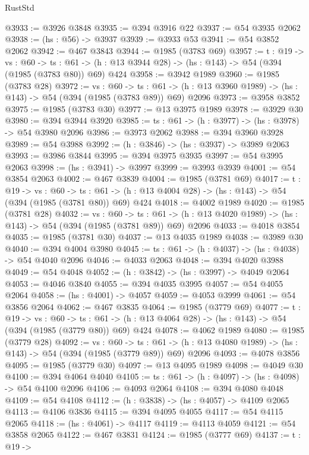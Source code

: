 \begin{lexlean}{RustStd}
\begin{coremodule}
{\begin{coremodule}
{{{{{{{{{{@3933 := @3926 @3848
@3935 := @394 @3916 @22
@3937 := @54 @3935 @2062
@3938 := (hs : @56) -> @3937
@3939 := @3933 @53
@3941 := @54 @3852 @2062
@3942 := @467 @3843
@3944 := @1985 (@3783 @69)
@3957 := {t : @19} ->
  {vs : @60} ->
  {ts : @61} -> (h : @13 @3944 @28) -> (hs : @143) -> @54 (@394 (@1985 (@3783 @80)) @69) @424
@3958 := @3942 @1989
@3960 := @1985 (@3783 @28)
@3972 := {vs : @60} ->
  {ts : @61} -> (h : @13 @3960 @1989) -> (hs : @143) -> @54 (@394 (@1985 (@3783 @89)) @69) @2096
@3973 := @3958 @3852
@3975 := @1985 (@3783 @30)
@3977 := @13 @3975 @1989
@3978 := @3929 @30
@3980 := @394 @3944 @3920
@3985 := {ts : @61} -> (h : @3977) -> (hs : @3978) -> @54 @3980 @2096
@3986 := @3973 @2062
@3988 := @394 @3960 @3928
@3989 := @54 @3988
@3992 := (h : @3846) -> (hs : @3937) -> @3989 @2063
@3993 := @3986 @3844
@3995 := @394 @3975 @3935
@3997 := @54 @3995 @2063
@3998 := (hs : @3941) -> @3997
@3999 := @3993 @3939
@4001 := @54 @3854 @2063
@4002 := @467 @3839
@4004 := @1985 (@3781 @69)
@4017 := {t : @19} ->
  {vs : @60} ->
  {ts : @61} -> (h : @13 @4004 @28) -> (hs : @143) -> @54 (@394 (@1985 (@3781 @80)) @69) @424
@4018 := @4002 @1989
@4020 := @1985 (@3781 @28)
@4032 := {vs : @60} ->
  {ts : @61} -> (h : @13 @4020 @1989) -> (hs : @143) -> @54 (@394 (@1985 (@3781 @89)) @69) @2096
@4033 := @4018 @3854
@4035 := @1985 (@3781 @30)
@4037 := @13 @4035 @1989
@4038 := @3989 @30
@4040 := @394 @4004 @3980
@4045 := {ts : @61} -> (h : @4037) -> (hs : @4038) -> @54 @4040 @2096
@4046 := @4033 @2063
@4048 := @394 @4020 @3988
@4049 := @54 @4048
@4052 := (h : @3842) -> (hs : @3997) -> @4049 @2064
@4053 := @4046 @3840
@4055 := @394 @4035 @3995
@4057 := @54 @4055 @2064
@4058 := (hs : @4001) -> @4057
@4059 := @4053 @3999
@4061 := @54 @3856 @2064
@4062 := @467 @3835
@4064 := @1985 (@3779 @69)
@4077 := {t : @19} ->
  {vs : @60} ->
  {ts : @61} -> (h : @13 @4064 @28) -> (hs : @143) -> @54 (@394 (@1985 (@3779 @80)) @69) @424
@4078 := @4062 @1989
@4080 := @1985 (@3779 @28)
@4092 := {vs : @60} ->
  {ts : @61} -> (h : @13 @4080 @1989) -> (hs : @143) -> @54 (@394 (@1985 (@3779 @89)) @69) @2096
@4093 := @4078 @3856
@4095 := @1985 (@3779 @30)
@4097 := @13 @4095 @1989
@4098 := @4049 @30
@4100 := @394 @4064 @4040
@4105 := {ts : @61} -> (h : @4097) -> (hs : @4098) -> @54 @4100 @2096
@4106 := @4093 @2064
@4108 := @394 @4080 @4048
@4109 := @54 @4108
@4112 := (h : @3838) -> (hs : @4057) -> @4109 @2065
@4113 := @4106 @3836
@4115 := @394 @4095 @4055
@4117 := @54 @4115 @2065
@4118 := (hs : @4061) -> @4117
@4119 := @4113 @4059
@4121 := @54 @3858 @2065
@4122 := @467 @3831
@4124 := @1985 (@3777 @69)
@4137 := {t : @19} ->
}}}}}}}}}}
\end{coremodule}}
\end{coremodule}
\end{lexlean}
